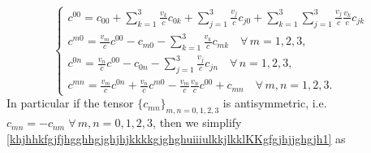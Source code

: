 \documentclass{article}
\theoremstyle{definition}
\theoremstyle{remark}
\newcommand{\er}{\eqref}
\newcommand{\er}{\eqref}
\begin{document}
\begin{equation}\label{khjhhkfgjfjhgghhgjghjhjkkkkgjghghuiiiulkkjlkklKKgfgjhjjghgjh1}
\begin{cases}
c^{00}=c_{00}+\sum_{k=1}^{3}\frac{v_k}{c}c_{0k}+\sum_{j=1}^{3}\frac{v_j}{c}c_{j0}+\sum_{k=1}^{3}\sum_{j=1}^{3}\frac{v_j}{c}\frac{v_k}{c}c_{jk}
\\
c^{m0}=
\frac{v_m}{c}c^{00}-c_{m0}-\sum_{k=1}^{3}\frac{v_k}{c}c_{mk}
\quad\forall\, m=1,2,3,
\\
c^{0n}=\frac{v_n}{c}c^{00}
-c_{0n} -\sum_{j=1}^{3}\frac{v_j}{c}c_{jn} \quad\forall\, n=1,2,3,
\\
c^{mn}=\frac{v_m}{c}c^{0n}+\frac{v_n}{c}c^{m0}-\frac{v_m}{c}\frac{v_n}{c}c^{00}
+c_{mn}\quad\forall\,
m,n=1,2,3.
\end{cases}
\end{equation}
In particular if the tensor $\{c_{mn}\}_{m,n=0,1,2,3}$ is
antisymmetric, i.e. $c_{mn}=-c_{nm}\;\forall \,m,n=0,1,2,3$, then we
simplify
\er{khjhhkfgjfjhgghhgjghjhjkkkkgjghghuiiiulkkjlkklKKgfgjhjjghgjh1}
as
\end{document}

